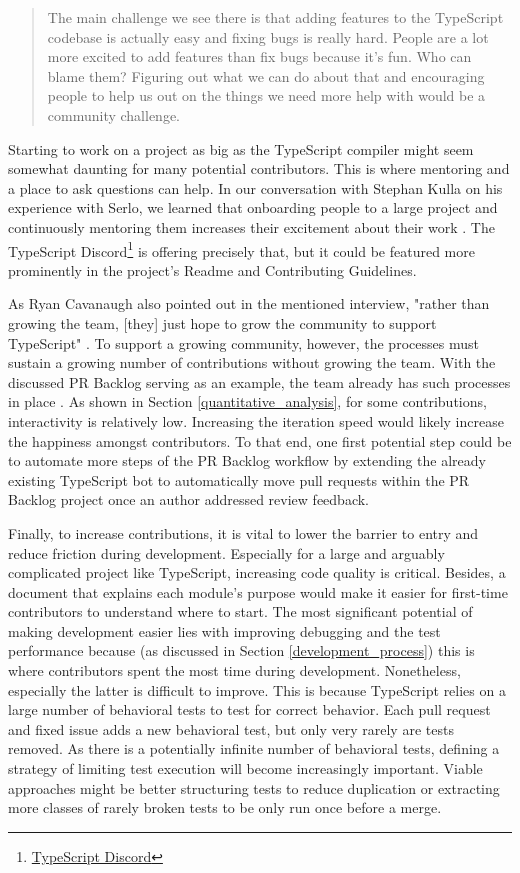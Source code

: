 \documentclass[12pt]{scrartcl}
\begin{document}
\begin{quote}
    The main challenge we see there is that adding features to the TypeScript codebase is actually easy and fixing bugs is really hard. People are a lot more excited to add features than fix bugs because it’s fun. Who can blame them? Figuring out what we can do about that and encouraging people to help us out on the things we need more help with would be a community challenge. \cite{RyanDonovan2020}
\end{quote}

Starting to work on a project as big as the TypeScript compiler might seem somewhat daunting for many potential contributors. This is where mentoring and a place to ask questions can help. In our conversation with Stephan Kulla on his experience with Serlo, we learned that onboarding people to a large project and continuously mentoring them increases their excitement about their work \cite{Priv2}. The TypeScript Discord\footnote{\href{https://discord.gg/typescript}{TypeScript Discord}} is offering precisely that, but it could be featured more prominently in the project's Readme and Contributing Guidelines.

As Ryan Cavanaugh also pointed out in the mentioned interview, "rather than growing the team, [they] just hope to grow the community to support TypeScript" \cite{RyanDonovan2020}. To support a growing community, however, the processes must sustain a growing number of contributions without growing the team. With the discussed PR Backlog serving as an example, the team already has such processes in place \cite{PRBacklog}. As shown in Section \ref{quantitative_analysis}, for some contributions, interactivity is relatively low. Increasing the iteration speed would likely increase the happiness amongst contributors. To that end, one first potential step could be to automate more steps of the PR Backlog workflow by extending the already existing TypeScript bot to automatically move pull requests within the PR Backlog project once an author addressed review feedback.

Finally, to increase contributions, it is vital to lower the barrier to entry and reduce friction during development. Especially for a large and arguably complicated project like TypeScript, increasing code quality is critical. Besides, a document that explains each module's purpose would make it easier for first-time contributors to understand where to start. The most significant potential of making development easier lies with improving debugging and the test performance because (as discussed in Section \ref{development_process}) this is where contributors spent the most time during development. Nonetheless, especially the latter is difficult to improve. This is because TypeScript relies on a large number of behavioral tests to test for correct behavior. Each pull request and fixed issue adds a new behavioral test, but only very rarely are tests removed. As there is a potentially infinite number of behavioral tests, defining a strategy of limiting test execution will become increasingly important. Viable approaches might be better structuring tests to reduce duplication or extracting more classes of rarely broken tests to be only run once before a merge.
\end{document}
